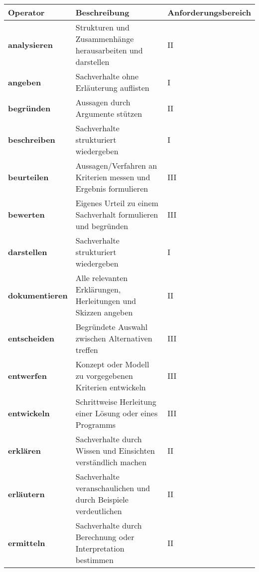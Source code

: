 \documentclass[
  11pt,
  a4paper,
  DIV=11,
  numbers=noendperiod]{scrartcl}
\begin{document}
\begin{longtable}[]{@{}
  >{\raggedright\arraybackslash}p{}
  >{\raggedright\arraybackslash}p{}
  >{\centering\arraybackslash}p{}@{}}
\toprule\noalign{}
\begin{minipage}[b]{\linewidth}\raggedright
Operator
\end{minipage} & \begin{minipage}[b]{\linewidth}\raggedright
Beschreibung
\end{minipage} & \begin{minipage}[b]{\linewidth}\centering
Anforderungsbereich
\end{minipage} \\
\midrule\noalign{}
\endhead
\bottomrule\noalign{}
\endlastfoot
\textbf{analysieren} & Strukturen und Zusammenhänge herausarbeiten und
darstellen & II \\
\textbf{angeben} & Sachverhalte ohne Erläuterung auflisten & I \\
\textbf{begründen} & Aussagen durch Argumente stützen & II \\
\textbf{beschreiben} & Sachverhalte strukturiert wiedergeben & I \\
\textbf{beurteilen} & Aussagen/Verfahren an Kriterien messen und
Ergebnis formulieren & III \\
\textbf{bewerten} & Eigenes Urteil zu einem Sachverhalt formulieren und
begründen & III \\
\textbf{darstellen} & Sachverhalte strukturiert wiedergeben & I \\
\textbf{dokumentieren} & Alle relevanten Erklärungen, Herleitungen und
Skizzen angeben & II \\
\textbf{entscheiden} & Begründete Auswahl zwischen Alternativen treffen
& III \\
\textbf{entwerfen} & Konzept oder Modell zu vorgegebenen Kriterien
entwickeln & III \\
\textbf{entwickeln} & Schrittweise Herleitung einer Lösung oder eines
Programms & III \\
\textbf{erklären} & Sachverhalte durch Wissen und Einsichten
verständlich machen & II \\
\textbf{erläutern} & Sachverhalte veranschaulichen und durch Beispiele
verdeutlichen & II \\
\textbf{ermitteln} & Sachverhalte durch Berechnung oder Interpretation
bestimmen & II \\

\end{longtable}
\end{document}
